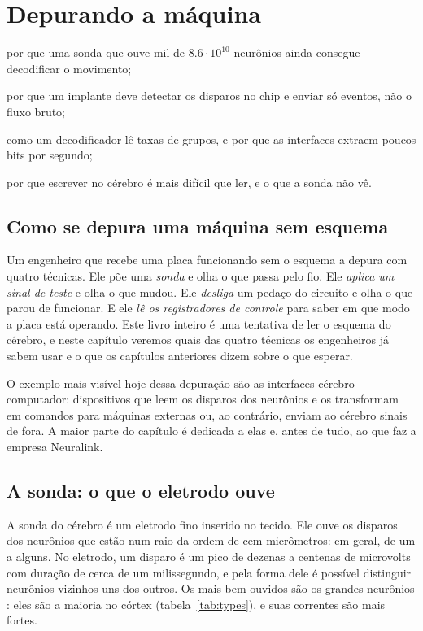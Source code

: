\chapter{Depurando a máquina}
\label{sec:debugging}
\begin{chaptergoals}
\item por que uma sonda que ouve mil de $8.6\cdot10^{10}$ neurônios ainda consegue decodificar o movimento;
\item por que um implante deve detectar os disparos no chip e enviar só eventos, não o fluxo bruto;
\item como um decodificador lê taxas de grupos, e por que as interfaces extraem poucos bits por segundo;
\item por que escrever no cérebro é mais difícil que ler, e o que a sonda não vê.
\end{chaptergoals}

\section{Como se depura uma máquina sem esquema}

Um engenheiro que recebe uma placa funcionando sem o esquema a depura com quatro técnicas. Ele põe uma \emph{sonda} e olha o que passa pelo fio. Ele \emph{aplica um sinal de teste} e olha o que mudou. Ele \emph{desliga} um pedaço do circuito e olha o que parou de funcionar. E ele \emph{lê os registradores de controle} para saber em que modo a placa está operando. Este livro inteiro é uma tentativa de ler o esquema do cérebro, e neste capítulo veremos quais das quatro técnicas os engenheiros já sabem usar e o que os capítulos anteriores dizem sobre o que esperar.

O exemplo mais visível hoje dessa depuração são as interfaces cérebro-computador: dispositivos que leem os disparos dos neurônios e os transformam em comandos para máquinas externas ou, ao contrário, enviam ao cérebro sinais de fora. A maior parte do capítulo é dedicada a elas e, antes de tudo, ao que faz a empresa Neuralink.

\section{A sonda: o que o eletrodo ouve}

A sonda do cérebro é um eletrodo fino inserido no tecido. Ele ouve os disparos dos neurônios que estão num raio da ordem de cem micrômetros: em geral, de um a alguns. No eletrodo, um disparo é um pico de dezenas a centenas de microvolts com duração de cerca de um milissegundo, e pela forma dele é possível distinguir neurônios vizinhos uns dos outros. Os mais bem ouvidos são os grandes neurônios : eles são a maioria no córtex (tabela~\ref{tab:types}), e suas correntes são mais fortes.

